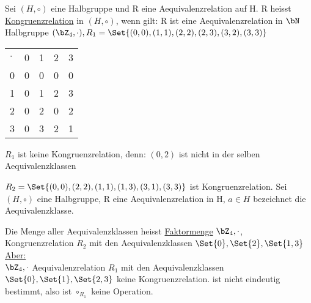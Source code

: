 Sei $(H, \circ)$ eine Halbgruppe und R eine Aequivalenzrelation auf H. R
heisst \underline{Kongruenzrelation} in $(H, \circ)$, wenn gilt:
R ist eine Aequivalenzrelation in $\bN$
Halbgruppe $(\bZ_4, \cdot), R_1 = \Set{(0,0), (1,1), (2,2), (2,3), (3,2), (3,3)}$
\begin{center}
  \begin{tabular}{lllll}
    $\cdot$ & 0 & 1 & 2 & 3 \\
    0     & 0 & 0 & 0 & 0 \\
    1     & 0 & 1 & 2 & 3 \\
    2     & 0 & 2 & 0 & 2 \\
    3     & 0 & 3 & 2 & 1
  \end{tabular}
   \end{center}
  $R_1$ ist keine Kongruenzrelation, denn:
  $(0,2)$ ist nicht in der selben Aequivalenzklassen

  $R_2 = \Set{(0,0), (2,2), (1,1), (1,3), (3,1), (3,3)}$
  ist Kongruenzrelation.
  Sei $(H, \circ)$ eine Halbgruppe, R eine Aequivalenzrelation in H, $a \in H$
  bezeichnet die Aequivalenzklasse.

  Die Menge
  aller Aequivalenzklassen heisst \underline{Faktormenge}
  $\bZ_4,\cdot$, Kongruenzrelation $R_2$ mit den Aequivalenzklassen
  $\Set{0},\Set{2},\Set{1,3}$
\underline{Aber:}\\
$ \bZ_4, \cdot$ Aequivalenzrelation $R_1$ mit den
Aequivalenzklassen  $\Set{0},\Set{1},\Set{2,3}$ keine Kongruenzrelation.
ist nicht eindeutig bestimmt, also ist $\circ_{R_1}$ keine Operation.

